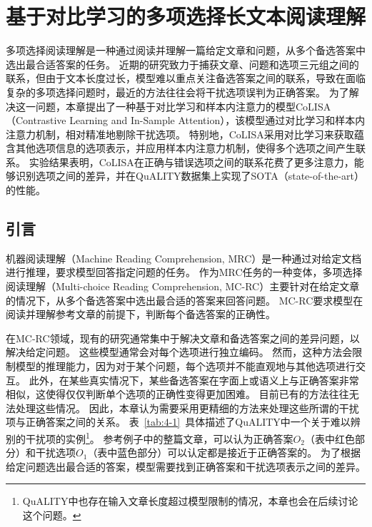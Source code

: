 \chapter{基于对比学习的多项选择长文本阅读理解}
多项选择阅读理解是一种通过阅读并理解一篇给定文章和问题，从多个备选答案中选出最合适答案的任务。
近期的研究致力于捕获文章、问题和选项三元组之间的联系，但由于文本长度过长，模型难以重点关注备选答案之间的联系，导致在面临复杂的多项选择问题时，最近的方法往往会将干扰选项误判为正确答案。
为了解决这一问题，本章提出了一种基于对比学习和样本内注意力的模型CoLISA（Contrastive Learning and In-Sample Attention），该模型通过对比学习和样本内注意力机制，相对精准地剔除干扰选项。
特别地，CoLISA采用对比学习来获取蕴含其他选项信息的选项表示，并应用样本内注意力机制，使得多个选项之间产生联系。
实验结果表明，CoLISA在正确与错误选项之间的联系花费了更多注意力，能够识别选项之间的差异，并在QuALITY数据集上实现了SOTA（state-of-the-art）的性能。


\section{引言}
机器阅读理解（Machine Reading Comprehension, MRC）是一种通过对给定文档进行推理，要求模型回答指定问题的任务。
作为MRC任务的一种变体，多项选择阅读理解（Multi-choice Reading Comprehension, MC-RC）主要针对在给定文章的情况下，从多个备选答案中选出最合适的答案来回答问题。
MC-RC要求模型在阅读并理解参考文章的前提下，判断每个备选答案的正确性。

在MC-RC领域，现有的研究通常集中于解决文章和备选答案之间的差异问题，以解决给定问题\cite{ran2019option,zhang2020dcmn+}。
这些模型通常会对每个选项进行独立编码。
然而，这种方法会限制模型的推理能力，因为对于某个问题，每个选项并不能直观地与其他选项进行交互。
此外，在某些真实情况下，某些备选答案在字面上或语义上与正确答案非常相似，这使得仅仅判断单个选项的正确性变得更加困难。
目前已有的方法往往无法处理这些情况。
因此，本章认为需要采用更精细的方法来处理这些所谓的干扰项与正确答案之间的关系。
表~\ref{tab:4-1}~具体描述了QuALITY\cite{pang2021quality}中一个关于难以辨别的干扰项的实例\footnote{QuALITY中也存在输入文章长度超过模型限制的情况，本章也会在后续讨论这个问题。}。
参考例子中的整篇文章，可以认为正确答案$O_2$（表中红色部分）和干扰选项$O_1$（表中蓝色部分）可以认定都是接近于正确答案的。
为了根据给定问题选出最合适的答案，模型需要找到正确答案和干扰选项表示之间的差异。



